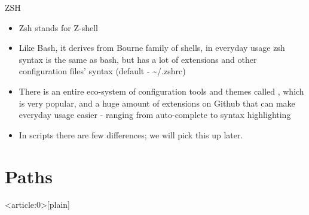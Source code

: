 \documentclass[usenames,dvipsnames,10pt,aspectratio=169]{beamer}
\begin{document}
\begin{frame}{ZSH}
    \begin{itemize}
        \item Zsh stands for {\color{ucugreen}Z-shell}
        \item Like Bash, it derives from Bourne family of shells, in everyday usage zsh syntax is the same as {\color{ucugreen} bash}, but has a lot of extensions and other configuration files' syntax (default - {\color{ucugreen} \textasciitilde/.zshrc})
        \item There is an entire eco-system of configuration tools and themes called , which is very popular, and a huge amount of extensions on Github that can make everyday usage easier - ranging from auto-complete to syntax highlighting
        \item In scripts there are few differences; we will pick this up later.
        
    \end{itemize}
\end{frame}

\section{Paths}

{ %
    \begin{frame}<article:0>[plain]
     \end{frame}
}
\end{document}

